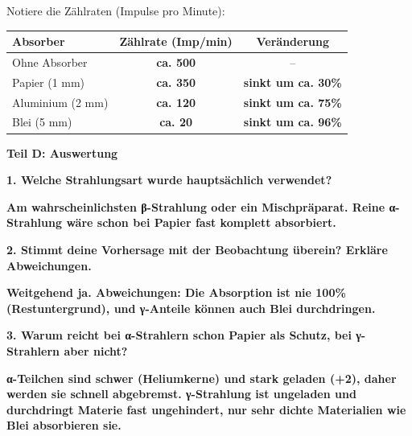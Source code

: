 \documentclass[10pt, a4paper]{article}
\newcommand{\fachfarbe}{physik}
\newcommand{\lsg}[1]{\textcolor{loesung}{\textbf{#1}}}
\newcommand{\abschnitt}[1]{%
    \vspace{8pt}\noindent\textbf{\textcolor{\fachfarbe}{#1}}\vspace{4pt}
}
\begin{document}
Notiere die Zählraten (Impulse pro Minute):

\vspace{6pt}

\begin{tabular}{|l|c|c|}
\hline
\textbf{Absorber} & \textbf{Zählrate (Imp/min)} & \textbf{Veränderung} \\
\hline
Ohne Absorber & \lsg{ca. 500} & -- \\
\hline
Papier (1 mm) & \lsg{ca. 350} & \lsg{sinkt um ca. 30\%} \\
\hline
Aluminium (2 mm) & \lsg{ca. 120} & \lsg{sinkt um ca. 75\%} \\
\hline
Blei (5 mm) & \lsg{ca. 20} & \lsg{sinkt um ca. 96\%} \\
\hline
\end{tabular}

\vspace{12pt}

\abschnitt{Teil D: Auswertung}

\textbf{1. Welche Strahlungsart wurde hauptsächlich verwendet?}

\vspace{4pt}
\lsg{Am wahrscheinlichsten β-Strahlung oder ein Mischpräparat. Reine α-Strahlung wäre schon bei Papier fast komplett absorbiert.}

\vspace{8pt}

\textbf{2. Stimmt deine Vorhersage mit der Beobachtung überein? Erkläre Abweichungen.}

\vspace{4pt}
\lsg{Weitgehend ja. Abweichungen: Die Absorption ist nie 100\% (Restuntergrund), und γ-Anteile können auch Blei durchdringen.}

\vspace{8pt}

\textbf{3. Warum reicht bei α-Strahlern schon Papier als Schutz, bei γ-Strahlern aber nicht?}

\vspace{4pt}
\lsg{α-Teilchen sind schwer (Heliumkerne) und stark geladen (+2), daher werden sie schnell abgebremst. γ-Strahlung ist ungeladen und durchdringt Materie fast ungehindert, nur sehr dichte Materialien wie Blei absorbieren sie.}
\end{document}
